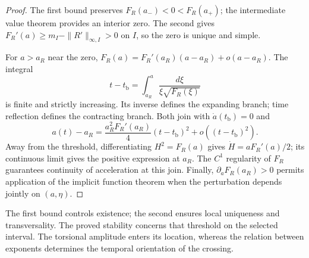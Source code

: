 \begin{proof}
The first bound preserves
\(F_R(a_-)<0<F_R(a_+)\); the intermediate value theorem provides
an interior zero. The second gives
\(F_R'(a)\geq m_I-\|R'\|_{\infty,I}>0\) on \(I\), so the zero
is unique and simple.

For \(a>a_R\) near the zero,
\(F_R(a)=F_R'(a_R)(a-a_R)+o(a-a_R)\).
The integral
\[
 t-t_{\mathrm b}=\int_{a_R}^{a}
          \frac{d\xi}{\xi\sqrt{F_R(\xi)}}
\]
is finite and strictly increasing. Its inverse defines the expanding
branch; time reflection defines the contracting branch.
Both join with \(\dot a(t_{\mathrm b})=0\) and
\[
 a(t)-a_R
 =\frac{a_R^2F_R'(a_R)}4(t-t_{\mathrm b})^2
   +o((t-t_{\mathrm b})^2).
\]
Away from the threshold, differentiating \(H^2=F_R(a)\) gives
\(\dot H=aF_R'(a)/2\); its continuous limit gives the positive expression
at \(a_R\). The \(C^1\) regularity of \(F_R\) guarantees continuity
of acceleration at this join. Finally,
\(\partial_aF_R(a_R)>0\) permits application of the implicit
function theorem when the perturbation depends jointly on \((a,\eta)\).
\end{proof}

The first bound controls existence; the second ensures local uniqueness
and transversality. The proved stability concerns
that threshold on the selected interval. The torsional amplitude
enters its location, whereas the relation between
exponents determines the temporal orientation of the crossing.

\par\endgroup
